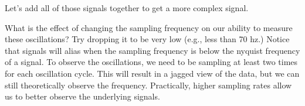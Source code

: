 \documentclass[letterpaper,10pt,english]{sphinxmanual}
\begin{document}
\noindent{}

Let’s add all of those signals together to get a more complex signal.

\begin{sphinxVerbatim}[commandchars=\\\{\}]
  
 
 
 
\end{sphinxVerbatim}

\noindent{}

What is the effect of changing the sampling frequency on our ability to measure these oscillations?  Try dropping it to be very low (e.g., less than 70 hz.)  Notice that signals will alias when the sampling frequency is below the nyquist frequency of a signal. To observe the oscillations, we need to be sampling at least two times for each oscillation cycle. This will result in a jagged view of the data, but we can still theoretically observe the frequency. Practically, higher sampling rates allow us to better observe the underlying signals.
\end{document}

